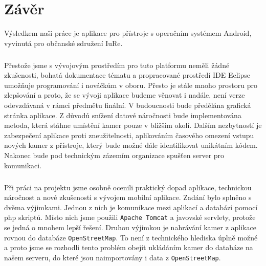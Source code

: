 \chapter{Závěr}
Výsledkem naši práce je aplikace pro přístroje s operačním systémem Android, vyvinutá pro občanské sdružení IuRe. 
\paragraph{}
Přestože jsme s vývojovým prostředím pro tuto platformu neměli žádné zkušenosti, bohatá dokumentace tématu a propracované prostředí IDE Eclipse umož\v{n}uje programování i nováčkům v oboru. Přesto je stále mnoho prostoru pro zlepšování a proto, že se vývoji aplikace budeme věnovat i nadále, není verze odevzdávaná v rámci předmětu finální. V budoucnosti bude předělána grafická stránka aplikace.  Z důvodů snížení datové náročnosti bude implementována metoda, která stáhne umístění kamer pouze v bližším okolí. Dalším nezbytností je zabezpečení aplikace proti zneužitelnosti, aplikováním časového omezení vstupu nových kamer z přístroje, který bude možné dále identifikovat unikátním k\'{o}dem. Nakonec bude pod technickým zázemím organizace spuš\v{t}en server pro komunikaci.
\paragraph{}
Při práci na projektu jsme osobně ocenili praktický dopad aplikace, technickou náročnost a nové zkušenosti s vývojem mobilní aplikace. Zadání bylo splněno s dvěma výjimkami. Jednou z nich je komunikace mezi aplikací a databází pomocí php skriptů. Místo nich jsme použili \texttt{Apache Tomcat} a javovské servlety, protože se jedná o mnohem lepší řešení. Druhou výjimkou je nahrávání kamer z aplikace rovnou do databáze \texttt{OpenStreetMap}. To není z technického hlediska úplně možné a proto jsme se rozhodli tento problém obejít ukládáním kamer do databáze na našem serveru, do které jsou naimportovány i data z \texttt{OpenStreetMap}. 